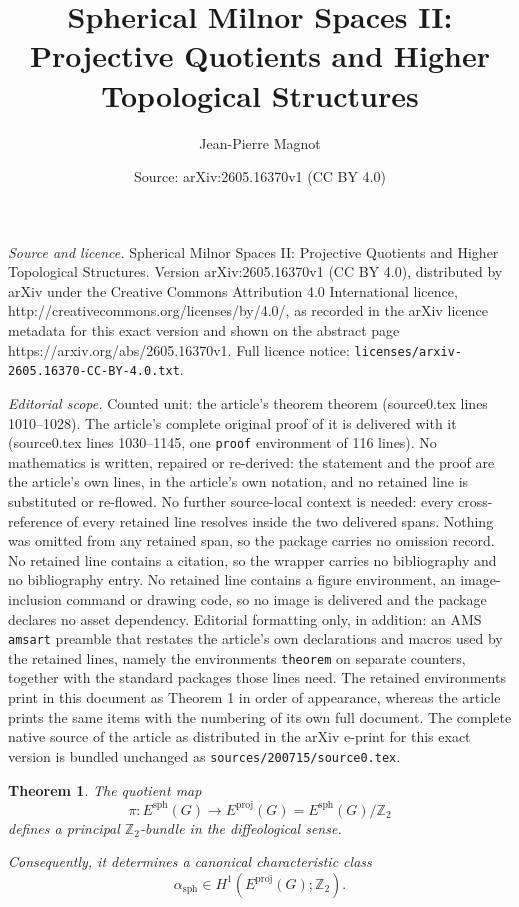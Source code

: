 \documentclass[10pt,a4paper]{amsart}
\title{Spherical Milnor Spaces II: Projective Quotients and Higher Topological Structures}
\author{Jean-Pierre Magnot}
\date{Source: arXiv:2605.16370v1 (CC BY 4.0)}
\newtheorem{theorem}{Theorem}
\begin{document}
\maketitle

\noindent\emph{Source and licence.} Spherical Milnor Spaces II: Projective Quotients and Higher Topological Structures. Version arXiv:2605.16370v1 (CC BY 4.0), distributed by arXiv under the Creative Commons Attribution 4.0 International licence, http://creativecommons.org/licenses/by/4.0/, as recorded in the arXiv licence metadata for this exact version and shown on the abstract page https://arxiv.org/abs/2605.16370v1. Full licence notice: \texttt{licenses/arxiv-2605.16370-CC-BY-4.0.txt}.\par\smallskip

\noindent\textit{Editorial scope.} Counted unit: the article's theorem theorem (source0.tex lines 1010--1028). The article's complete original proof of it is delivered with it (source0.tex lines 1030--1145, one \texttt{proof} environment of 116 lines). No mathematics is written, repaired or re-derived: the statement and the proof are the article's own lines, in the article's own notation, and no retained line is substituted or re-flowed.  No further source-local context is needed: every cross-reference of every retained line resolves inside the two delivered spans.  Nothing was omitted from any retained span, so the package carries no omission record.  No retained line contains a citation, so the wrapper carries no bibliography and no bibliography entry.  No retained line contains a figure environment, an image-inclusion command or drawing code, so no image is delivered and the package declares no asset dependency.  Editorial formatting only, in addition: an AMS \texttt{amsart} preamble that restates the article's own declarations and macros used by the retained lines, namely the environments \texttt{theorem} on separate counters, together with the standard packages those lines need.  The retained environments print in this document as Theorem 1 in order of appearance, whereas the article prints the same items with the numbering of its own full document.  The complete native source of the article as distributed in the arXiv e-print for this exact version is bundled unchanged as \texttt{sources/200715/source0.tex}.
\begin{theorem}
The quotient map
\[
\pi:
E^{\mathrm{sph}}(G)
\longrightarrow
E^{\mathrm{proj}}(G)
=
E^{\mathrm{sph}}(G)/\mathbb Z_2
\]
defines a principal \(\mathbb Z_2\)-bundle in the diffeological sense.

Consequently, it determines a canonical characteristic class
\[
\alpha_{\mathrm{sph}}
\in
H^1(E^{\mathrm{proj}}(G);\mathbb Z_2).
\]
\end{theorem}
\end{document}
